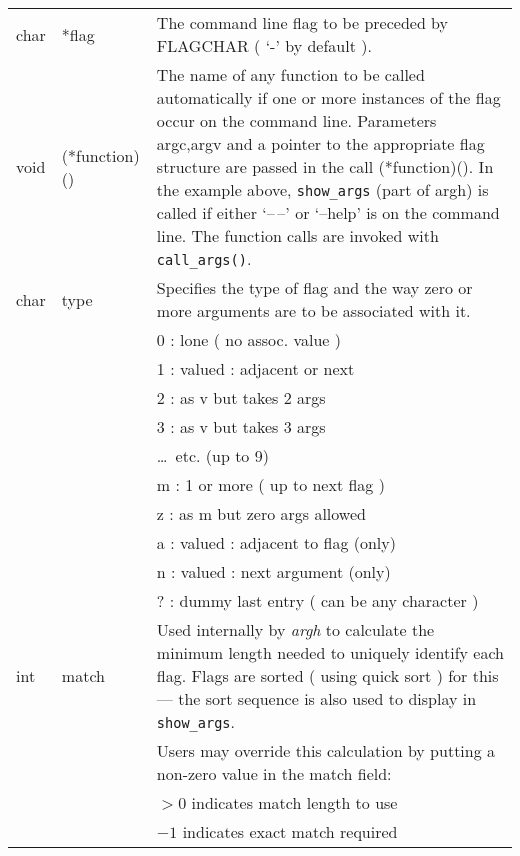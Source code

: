 \begin{tabular}{llp{3.5in}}
char &  *flag &         The command line flag to be preceded by FLAGCHAR
                        ( `-' by default ). \\

void &  (*function)() & The name of any function to be called automatically
                        if one or more instances of the flag occur on the
                        command line.  Parameters argc,argv and a pointer
			to the appropriate flag structure are passed
                        in the call (*function)().  In the example
                        above, \verb+show_args+ (part of argh) is called if
                        either `--\,--' or `--help' is on the command line.
                        The function calls are invoked with \verb+call_args()+. \\

char &  type &          Specifies the type of flag and the way zero or more
                        arguments are to be associated with it. \\

&&                      0 : lone ( no assoc. value ) \\
&&                      1 : valued : adjacent or next \\
&&                      2 : as v but takes 2 args \\
&&                      3 : as v but takes 3 args \\

&&                      \ldots\ etc. (up to 9) \\

&&                      m : 1 or more ( up to next flag ) \\
&&                      z : as m but zero args allowed \\

&&                      a : valued : adjacent to flag (only) \\
&&                      n : valued : next argument (only) \\

&&                      ? : dummy last entry ( can be any character ) \\


int &   match &         Used internally by {\em argh\/} to calculate the minimum
                        length needed to uniquely identify each flag.
                        Flags are sorted ( using quick sort ) for this --- 
                        the sort sequence is also used to display in \verb+show_args+. \\

&&                      Users may override this calculation by putting a
                        non-zero value in the match field: \\

&&                        $>0$ indicates match length to use \\
&&                        $-1$ indicates exact match required \\

\end{tabular}

